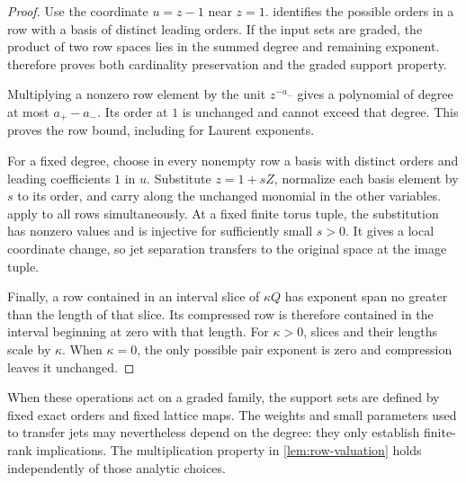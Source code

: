 \begin{proof}
Use the coordinate $u=z-1$ near $z=1$.  identifies the possible orders in a row with a basis of distinct leading orders. If the input sets are graded, the product of two row spaces lies in the summed degree and remaining exponent.  therefore proves both cardinality preservation and the graded support property.

Multiplying a nonzero row element by the unit $z^{-a_-}$ gives a polynomial of degree at most $a_+-a_-$. Its order at $1$ is unchanged and cannot exceed that degree. This proves the row bound, including for Laurent exponents.

For a fixed degree, choose in every nonempty row a basis with distinct orders and leading coefficients $1$ in $u$. Substitute $z=1+sZ$, normalize each basis element by $s$ to its order, and carry along the unchanged monomial in the other variables.  apply to all rows simultaneously. At a fixed finite torus tuple, the substitution has nonzero values and is injective for sufficiently small $s>0$. It gives a local coordinate change, so jet separation transfers to the original space at the image tuple.

Finally, a row contained in an interval slice of $\kappa Q$ has exponent span no greater than the length of that slice. Its compressed row is therefore contained in the interval beginning at zero with that length. For $\kappa>0$, slices and their lengths scale by $\kappa$. When $\kappa=0$, the only possible pair exponent is zero and compression leaves it unchanged.
\end{proof}

When these operations act on a graded family, the support sets are defined by fixed exact orders and fixed lattice maps. The weights and small parameters used to transfer jets may nevertheless depend on the degree: they only establish finite-rank implications. The multiplication property in \cref{lem:row-valuation} holds independently of those analytic choices.
